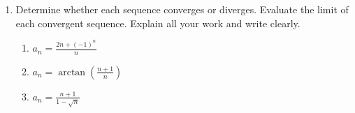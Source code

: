 \documentclass[a4paper, 12pt]{article}
\renewcommand{\headrulewidth}{0pt}
\begin{document}
\begin{enumerate}[leftmargin=*,label=\textbf{\arabic*.}]
\item Determine whether each sequence converges or diverges. Evaluate the limit of each convergent sequence. Explain all your work and write clearly.

\begin{enumerate}[leftmargin=*,label=\textbf{\alph*.}]
\item $\displaystyle a_n=\frac{2n+(-1)^n}n$
\item $\displaystyle a_n=\arctan\left(\frac{n+1}n\right)$
\item $\displaystyle a_n = \frac{n+1}{1-\sqrt n}$
\end{enumerate}
\end{enumerate}

\newpage
\pagestyle{fancy}
\renewcommand{\headrulewidth}{1pt}

\end{document}
